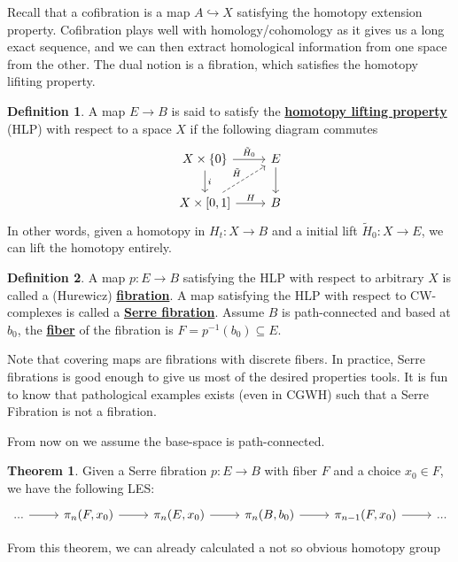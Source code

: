 \documentclass{article}
\theoremstyle{definition}
\newtheorem{theorem}{Theorem}[section]
\theoremstyle{definition}
\theoremstyle{definition}
\theoremstyle{definition}
\theoremstyle{definition}
\newtheorem{definition}{Definition}[section]
\theoremstyle{definition}
\theoremstyle{definition}
\begin{document}
Recall that a cofibration is a map $A\hookrightarrow X$ satisfying the homotopy extension property. Cofibration plays well with homology/cohomology as it gives us a long exact sequence, and we can then extract homological information from one space from the other. The dual notion is a fibration, which satisfies the homotopy lifiting property.

\begin{tcolorbox}[colback=purple!5!white,colframe=purple!75!black]
\begin{definition}
A map $E\to B$ is said to satisfy the \underline{\textbf{homotopy lifting property}} (HLP) with respect to a space $X$ if the following diagram commutes
\[
\begin{tikzcd}
X\times \{0\}\arrow[r,"\tilde{H}_0"]\arrow[d,"i"]&E\arrow[d]\\
X\times [0,1]\arrow[r,"H"]\arrow[ur,dashed,"\tilde{H}"]&B
\end{tikzcd}    
\]
In other words, given a homotopy in $H_t: X\to B$ and a initial lift $\tilde{H}_0: X\to E$, we can lift the homotopy entirely.
\end{definition}
\end{tcolorbox}

\begin{tcolorbox}[colback=purple!5!white,colframe=purple!75!black]
\begin{definition}
A map $p:E\to B$ satisfying the HLP with respect to arbitrary $X$ is called a (Hurewicz)  \underline{\textbf{fibration}}. A map satisfying the HLP with respect to CW-complexes is called a \underline{\textbf{Serre fibration}}. Assume $B$ is path-connected and based at $b_0$, the \underline{\textbf{fiber}} of the fibration is $F=p^{-1}(b_0)\subseteq E$.
\end{definition}
\end{tcolorbox}
Note that covering maps are fibrations with discrete fibers. In practice, Serre fibrations is good enough to give us most of the desired properties tools. It is fun to know that pathological examples exists (even in CGWH) such that a Serre Fibration is not a fibration. 

From now on we assume the base-space is path-connected.
\begin{tcolorbox}[colback=red!5!white,colframe=red!30!white]
\begin{theorem}
Given a Serre fibration $p:E\to B$ with fiber $F$ and a choice $x_0\in F$, we have the following LES:
\[
\begin{tikzcd}
...\arrow[r]&\pi_n(F,x_0)\arrow[r]&\pi_n(E,x_0)\arrow[r]&\pi_n(B,b_0)\arrow[r]&\pi_{n-1}(F,x_0)\arrow[r]&...
\end{tikzcd}
\]
\end{theorem}
\end{tcolorbox}
From this theorem, we can already calculated a not so obvious homotopy group
\end{document}
